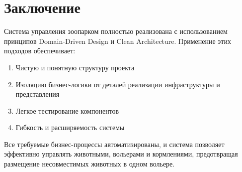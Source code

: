 \documentclass[a4paper,12pt]{article}
\begin{document}
\section{Заключение}

Система управления зоопарком полностью реализована с использованием принципов Domain-Driven Design и Clean Architecture. Применение этих подходов обеспечивает:

\begin{enumerate}
    \item Чистую и понятную структуру проекта
    \item Изоляцию бизнес-логики от деталей реализации инфраструктуры и представления
    \item Легкое тестирование компонентов
    \item Гибкость и расширяемость системы
\end{enumerate}

Все требуемые бизнес-процессы автоматизированы, и система позволяет эффективно управлять животными, вольерами и кормлениями, предотвращая размещение несовместимых животных в одном вольере.
\end{document}
